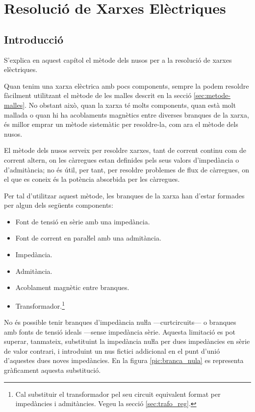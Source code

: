 
\chapter{Resolució de Xarxes Elèctriques} \label{sec:ch-xarxes-elec}
\section{Introducció}\label{sec:ch-xarxes-elec-intro}
S'explica en aquest capítol el
mètode dels nusos per a la resolució de xarxes elèctriques.

Quan tenim una xarxa elèctrica amb pocs components, sempre la podem resoldre fàcilment
utilitzant el mètode de les malles descrit en la secció \vref{sec:metode-malles}. No obstant això, quan la xarxa té molts components, quan està
 molt mallada o quan hi ha acoblaments magnètics entre diverses branques de la xarxa, és millor
 emprar un mètode sistemàtic per  resoldre-la, com ara el mètode dels nusos.

El mètode dels nusos serveix per resoldre xarxes, tant de corrent
continu com de corrent altern, on les càrregues estan definides pels
seus valors d'impedància o d'admitància; no és útil, per tant, per
resoldre problemes de flux de càrregues, on el que es coneix és la
potència absorbida per les càrregues.

Per tal d'utilitzar aquest mètode, les branques de la xarxa han d'estar
formades per algun dels següents components: \vspace{-1.5mm}
\begin{itemize}
   \item Font de tensió en sèrie amb una impedància.
   \item Font de corrent en paraŀlel amb una admitància.
   \item Impedància.
   \item Admitància.
   \item Acoblament magnètic entre branques.
   \item Transformador.\footnote{Cal substituir el transformador pel seu circuit equivalent format per impedàncies i    admitàncies. Vegeu la secció \ref{sec:trafo_reg}.}
\end{itemize}
\vspace{-1.5mm}

No és possible tenir branques d'impedància nuŀla ---curtcircuits--- o
branques amb fonts de tensió ideals  ---sense impedància sèrie.
Aquesta limitació es pot superar, tanmateix, substituint la
impedància nuŀla per dues impedàncies en sèrie  de valor
contrari, i introduint un nus fictici addicional en el punt d'unió
d'aquestes dues noves impedàncies. En la figura
\vref{pic:branca_nula}
 es representa gràficament aquesta substitució. 
\begin{center}
   
    \label{pic:branca_nula}
\end{center}

